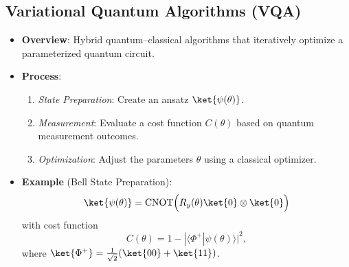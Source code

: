 \begin{multicols}{3}
                  \section*{Variational Quantum Algorithms (VQA)}
                  \begin{itemize}[leftmargin=*,nosep,topsep=0pt]
                    \item \textbf{Overview}: Hybrid quantum–classical
                      algorithms that iteratively optimize a parameterized
                      quantum circuit.
                    \item \textbf{Process}:
                      \begin{enumerate}[nosep]
                        \item \textit{State Preparation}: Create an ansatz
                          $\ket{\psi(\theta)}$.
                        \item \textit{Measurement}: Evaluate a cost function
                          $C(\theta)$ based on quantum measurement outcomes.
                        \item \textit{Optimization}: Adjust the parameters
                          $\theta$ using a classical optimizer.
                      \end{enumerate}
                    \item \textbf{Example} (Bell State Preparation):
                      \[
                        \ket{\psi(\theta)} = \mathrm{CNOT}\Bigl(R_y(\theta)\ket{0}\otimes\ket{0}\Bigr)
                      \]
                      with cost function
                      \[
                        C(\theta)=1-|\langle\Phi^+|\psi(\theta)\rangle|^2,
                      \]
                      where $\ket{\Phi^+}=\frac{1}{\sqrt{2}}(\ket{00}+\ket{11})$.
                  \end{itemize}


\end{multicols}
